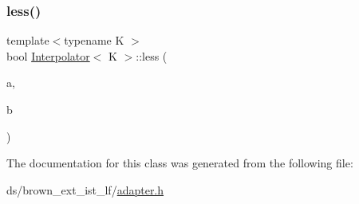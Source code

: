 \subsubsection{\texorpdfstring{less()}{less()}}
{\footnotesize\ttfamily template$<$typename K $>$ \\
bool \hyperlink{classInterpolator}{Interpolator}$<$ K $>$\+::less (\begin{DoxyParamCaption}\item[{const K \&}]{a,  }\item[{const K \&}]{b }\end{DoxyParamCaption})}



The documentation for this class was generated from the following file\+:\begin{DoxyCompactItemize}
\item 
ds/brown\+\_\+ext\+\_\+ist\+\_\+lf/\hyperlink{brown__ext__ist__lf_2adapter_8h}{adapter.\+h}\end{DoxyCompactItemize}
